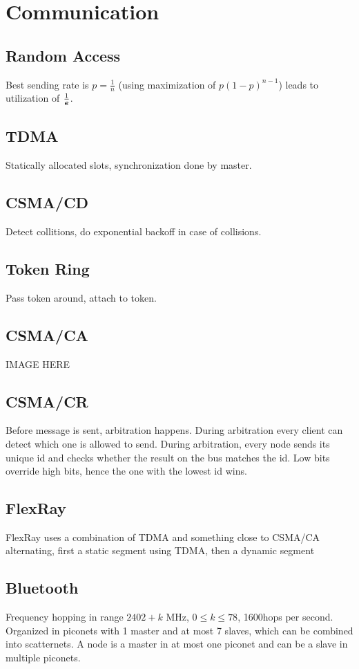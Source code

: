 \section{Communication}
\subsection{Random Access}
Best sending rate is $p = \frac{1}{n}$ (using maximization of
$p \left(1 - p\right)^{n-1}$) leads to utilization of $\frac{1}{\boldsymbol{e}}$.

\subsection{TDMA}
Statically allocated slots, synchronization done by master.

\subsection{CSMA/CD}
Detect collitions, do exponential backoff in case of collisions.

\subsection{Token Ring}
Pass token around, attach to token.

\subsection{CSMA/CA}
IMAGE HERE

\subsection{CSMA/CR}
Before message is sent, arbitration happens. During arbitration every client can
detect which one is allowed to send. During arbitration, every node sends its
unique id and checks whether the result on the bus matches the id. Low bits
override high bits, hence the one with the lowest id wins.

\subsection{FlexRay}
FlexRay uses a combination of TDMA and something close to CSMA/CA alternating,
first a static segment using TDMA, then a dynamic segment

\subsection{Bluetooth}
Frequency hopping in range $2402 + k$ MHz, $0 \leq k \leq 78$, 1600hops per
second. Organized in piconets with 1 master and at most 7 slaves, which can be
combined into scatternets. A node is a master in at most one piconet and can be
a slave in multiple piconets.

